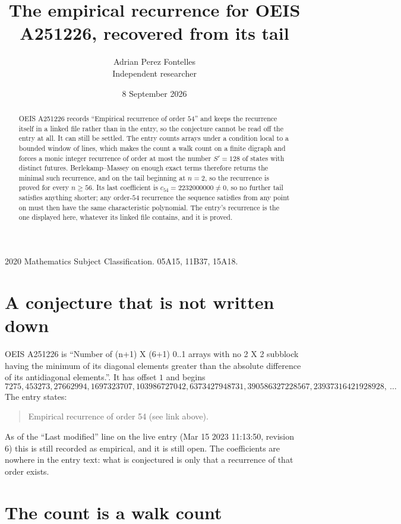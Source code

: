 \documentclass[11pt,a4paper]{article}
\title{The empirical recurrence for OEIS A251226, recovered from its tail}
\author{Adrian Perez Fontelles\\ \small Independent researcher}
\date{8 September 2026}
\theoremstyle{plain}
\theoremstyle{definition}
\begin{document}
\maketitle

\begin{abstract}
OEIS A251226 records ``Empirical recurrence of order $54$'' and keeps the recurrence itself in
a linked file rather than in the entry, so the conjecture cannot be read off the entry at all.
It can still be settled. The entry counts arrays under a condition local to a bounded window of
lines, which makes the count a walk count on a finite digraph and forces a monic integer
recurrence of order at most the number $S'=128$ of states with distinct futures. Berlekamp--Massey on
enough exact terms therefore returns the minimal such recurrence, and on the tail beginning at $n=2$, so the recurrence is proved for every $n\ge56$.
Its last coefficient is $c_{54}=2232000000\neq0$, so no further tail satisfies anything
shorter; any order-$54$ recurrence the sequence satisfies from any point on must then have
the same characteristic polynomial. The entry's recurrence is the one displayed here, whatever
its linked file contains, and it is proved.
\end{abstract}

\noindent\small 2020 Mathematics Subject Classification. 05A15, 11B37, 15A18.\normalsize

\section{A conjecture that is not written down}

OEIS A251226 is ``Number of (n+1) X (6+1) 0..1 arrays with no 2 X 2 subblock having the minimum of its diagonal elements greater than the absolute difference of its antidiagonal elements.''. It has offset $1$ and begins
\[
7275, 453273, 27662994, 1697323707, 103986727042, 6373427948731, 390586327228567, 23937316421928928,\ \dots
\]
The entry states:
\begin{quote}
Empirical recurrence of order 54 (see link above).
\end{quote}
As of the ``Last modified'' line on the live entry (Mar 15 2023 11:13:50, revision 6)
this is still recorded as empirical, and it is still open. The coefficients are nowhere in the
entry text: what is conjectured is only that a recurrence of that order exists.

\section{The count is a walk count}
\end{document}
